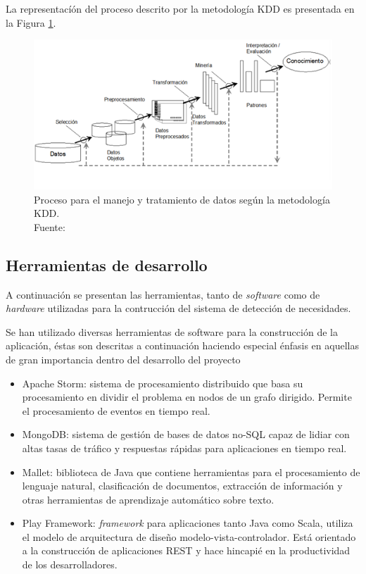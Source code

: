 La representacíón del proceso descrito por la metodología KDD es presentada en la Figura \ref{fig:procesoKDD}.

\begin{figure}[H]
	\centering
	\captionsetup{justification=centering}
	\includegraphics[scale=1]{images/kdd.png}
	\caption[Proceso para el manejo y tratamiento de datos según la metodología KDD.]{Proceso para el manejo y tratamiento de datos según la metodología KDD.\\Fuente: \citep{KDDFigure}}
	\label{fig:procesoKDD}
\end{figure}

\subsection{Herramientas de desarrollo}
\label{subsec:HerrDesarrollo}

A continuación se presentan las herramientas, tanto de \textit{software} como de \textit{hardware} utilizadas para la contrucción del sistema de detección de necesidades.

Se han utilizado diversas herramientas de software para la construcción de la aplicación, éstas son descritas a continuación haciendo especial énfasis en aquellas de gran importancia dentro del desarrollo del proyecto

\begin{itemize}
\item Apache Storm: sistema de procesamiento distribuido que basa su procesamiento en dividir el problema en nodos de un grafo dirigido. Permite el procesamiento de eventos en tiempo real.
\item MongoDB: sistema de gestión de bases de datos no-SQL capaz de lidiar con altas tasas de tráfico y respuestas rápidas para aplicaciones en tiempo real.
\item Mallet: biblioteca de Java que contiene herramientas para el procesamiento de lenguaje natural, clasificación de documentos, extracción de información y otras herramientas de aprendizaje automático sobre texto. 
\item Play Framework: \textit{framework} para aplicaciones tanto Java como Scala, utiliza el modelo de arquitectura de diseño modelo-vista-controlador. Está orientado a la construcción de aplicaciones REST y hace hincapié en la productividad de los desarrolladores.
\end{itemize}

